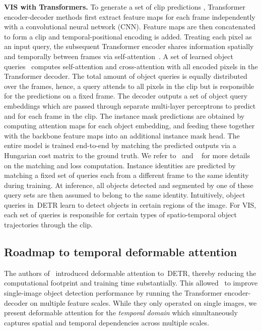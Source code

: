 \documentclass[runningheads]{llncs}
\newcommand{\detr}{\mbox{DETR}}
\begin{document}
\noindent \textbf{VIS with Transformers.}
To generate a set of clip predictions , Transformer encoder-decoder methods first extract feature maps for each frame independently with a convolutional neural network (CNN).
Feature maps are then concatenated to form a clip and temporal-positional encoding is added.
Treating each pixel as an input query, the subsequent Transformer encoder shares information spatially and temporally between frames via self-attention~\cite{attention_is_all_you_need}.
A set of learned object queries~\cite{DETR} computes self-attention and cross-attention with all encoded pixels in the Transformer decoder.
The total amount of object queries is equally distributed over the frames, hence, a query attends to all pixels in the clip but is responsible for the predictions on a fixed frame.
The decoder outputs a set of object query embeddings which are passed through separate multi-layer perceptrons to predict  and  for each frame in the clip.
The instance mask predictions  are obtained by computing attention maps for each object embedding, and feeding these together with the backbone feature maps into an additional instance mask head.
The entire model is trained end-to-end by matching the predicted outputs  via a Hungarian cost matrix to the ground truth.
We refer to~\cite{DETR} and ~\cite{vistr} for more details on the matching and loss computation.
Instance identities  are predicted by matching a fixed set of queries each from a different frame to the same identity during training.
At inference, all objects detected and segmented by one of these query sets are then assumed to belong to the same identity.
Intuitively, object queries in~\detr{} learn to detect objects in certain regions of the image.
For VIS, each set of queries is responsible for certain types of spatio-temporal object trajectories through the clip.

\subsection{Roadmap to temporal deformable attention}
\label{sec:temp_ms_def_att}

The authors of~\cite{deformable_detr} introduced deformable attention to~\detr{}, thereby reducing the computational footprint and training time substantially.
This allowed~\cite{deformable_detr} to improve single-image object detection performance by running the Transformer encoder-decoder on multiple feature scales.
While they only operated on single images, we present deformable attention for the \textit{temporal domain} which simultaneously captures spatial and temporal dependencies across multiple scales.
\end{document}
